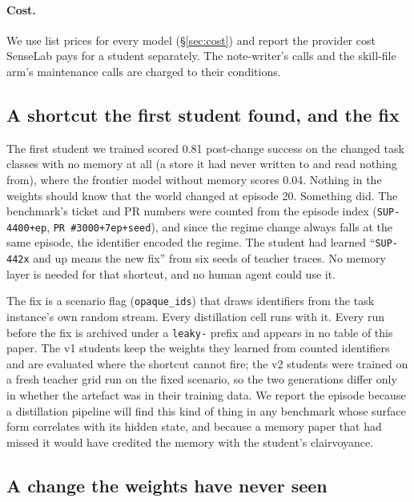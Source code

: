 \documentclass[11pt]{article}
\begin{document}
\paragraph{Cost.} We use list prices for every model (\S\ref{sec:cost}) and report the
provider cost SenseLab pays for a student separately. The note-writer's calls and the
skill-file arm's maintenance calls are charged to their conditions.

\subsection{A shortcut the first student found, and the fix}
\label{sec:leak}

The first student we trained scored 0.81 post-change success on the changed task classes with no memory at all (a store it had never written to and read nothing from), where the frontier model without memory scores 0.04. Nothing in the weights should know that the world changed at episode 20. Something did. The benchmark's ticket and PR numbers were counted from the episode index (\texttt{SUP-4400+ep}, \texttt{PR \#3000+7ep+seed}), and since the regime change always falls at the same episode, the identifier encoded the regime. The student had learned ``\texttt{SUP-442x} and up means the new fix'' from six seeds of teacher traces. No memory layer is needed for that shortcut, and no human agent could use it.

The fix is a scenario flag (\texttt{opaque\_ids}) that draws identifiers from the task instance's own random stream. Every distillation cell runs with it. Every run before the fix is archived under a \texttt{leaky-} prefix and appears in no table of this paper. The v1 students keep the weights they learned from counted identifiers and are evaluated where the shortcut cannot fire; the v2 students were trained on a fresh teacher grid run on the fixed scenario, so the two generations differ only in whether the artefact was in their training data. We report the episode because a distillation pipeline will find this kind of thing in any benchmark whose surface form correlates with its hidden state, and because a memory paper that had missed it would have credited the memory with the student's clairvoyance.

\subsection{A change the weights have never seen}
\label{sec:novel-method}
\end{document}
